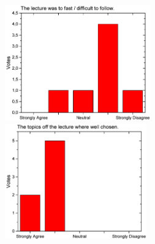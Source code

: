 \begin{figure}[h!]
\begin{minipage}{.48\linewidth}
      {\includegraphics[height=50mm]{figures/n/Graph65.pdf}}
      {\includegraphics[height=50mm]{figures/n/Graph66.pdf}}
  \end{minipage}
\end{figure}

